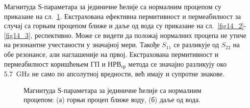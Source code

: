 \documentclass[main.tex]{subfiles}
\begin{document}
Магнитуда $Ѕ$-параметара за јединичне ћелије са нормалним процепом су приказане на сл.~\ref{fig14_1}. Екстрахована ефективна пермитивност и пермеабилност за случај са горњим процепом ближе и даље од вода су приказане на сл.~\ref{fig14_2}-\ref{fig14_3}, респективно. Може се видети да положај нормалних процепа не утиче на резонантне учестаности у значајној мери. Такође $S_{11}$ се разликује од $S_{22}$ на обе резонансе, али наглашеније на првој. Екстрахована пермитивност и пермеабилност коришћењем ГП и $НРВ_{ср}$ метода се значајно разликују око \SI{5.7}{\giga\hertz} не само по апсолутној вредности, већ имају и супротне знакове.
\begin{figure}[!t]
\centering
{}
\hfill
{}
\caption{Магнитуда $Ѕ$-параметара за јединичне ћелије са нормалним процепом: (а) горњи процеп ближе воду, (б) даље од вода.}
\label{fig14_1}
\end{figure}
\end{document}
